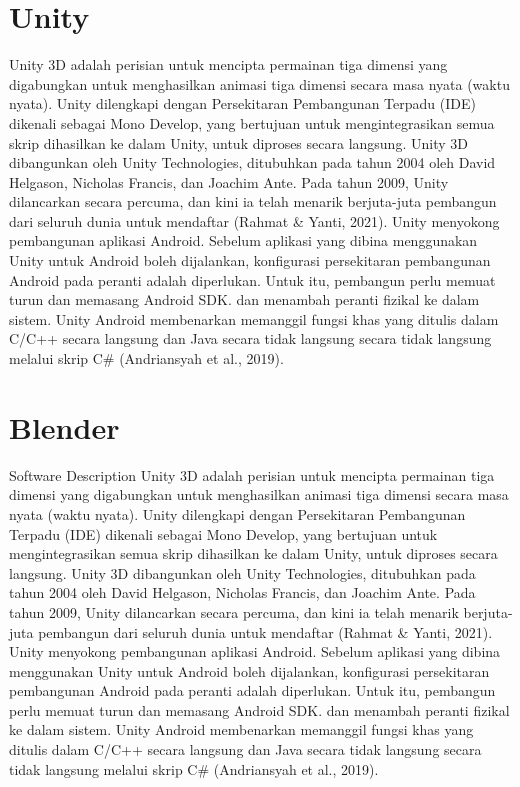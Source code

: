 \section{Unity }
Unity 3D adalah perisian untuk mencipta permainan tiga dimensi yang 
digabungkan untuk menghasilkan animasi tiga dimensi secara masa nyata 
(waktu nyata). Unity dilengkapi dengan Persekitaran Pembangunan Terpadu (IDE) 
dikenali sebagai Mono Develop, yang bertujuan untuk mengintegrasikan semua skrip 
dihasilkan ke dalam Unity, untuk diproses secara langsung. Unity 3D 
dibangunkan oleh Unity Technologies, ditubuhkan pada tahun 2004 oleh David 
Helgason, Nicholas Francis, dan Joachim Ante. Pada tahun 2009, Unity dilancarkan 
secara percuma, dan kini ia telah menarik berjuta-juta pembangun dari seluruh dunia 
untuk mendaftar (Rahmat & Yanti, 2021). Unity menyokong pembangunan aplikasi 
Android. Sebelum aplikasi yang dibina menggunakan Unity untuk Android 
boleh dijalankan, konfigurasi persekitaran pembangunan Android pada peranti adalah  diperlukan. Untuk itu, pembangun perlu memuat turun dan memasang Android SDK.  dan menambah peranti fizikal ke dalam sistem. Unity Android membenarkan memanggil fungsi khas yang ditulis dalam C/C++ secara langsung dan Java secara tidak langsung secara tidak langsung melalui skrip C# (Andriansyah et al., 2019).

\section{Blender}
Software	Description
	Unity 3D adalah perisian untuk mencipta permainan tiga dimensi yang 
digabungkan untuk menghasilkan animasi tiga dimensi secara masa nyata 
(waktu nyata). Unity dilengkapi dengan Persekitaran Pembangunan Terpadu (IDE) 
dikenali sebagai Mono Develop, yang bertujuan untuk mengintegrasikan semua skrip 
dihasilkan ke dalam Unity, untuk diproses secara langsung. Unity 3D 
dibangunkan oleh Unity Technologies, ditubuhkan pada tahun 2004 oleh David 
Helgason, Nicholas Francis, dan Joachim Ante. Pada tahun 2009, Unity dilancarkan 
secara percuma, dan kini ia telah menarik berjuta-juta pembangun dari seluruh dunia 
untuk mendaftar (Rahmat & Yanti, 2021). Unity menyokong pembangunan aplikasi 
Android. Sebelum aplikasi yang dibina menggunakan Unity untuk Android 
boleh dijalankan, konfigurasi persekitaran pembangunan Android pada peranti adalah  diperlukan. Untuk itu, pembangun perlu memuat turun dan memasang Android SDK.  dan menambah peranti fizikal ke dalam sistem. Unity Android membenarkan memanggil fungsi khas yang ditulis dalam C/C++ secara langsung dan Java secara tidak langsung secara tidak langsung melalui skrip C# (Andriansyah et al., 2019).


